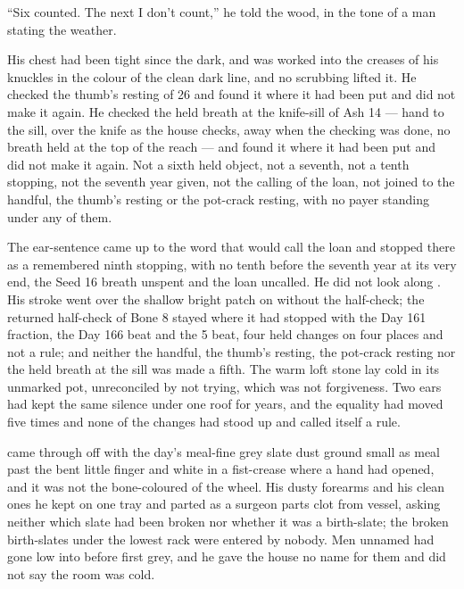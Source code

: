 “Six counted. The next I don't count,” he told the wood, in the tone of a man stating the weather.

His chest had been tight since the dark, and  was worked into the creases of his knuckles in the colour of the clean dark line, and no scrubbing lifted it. He checked the thumb's resting of  26 and found it where it had been put and did not make it again. He checked the held breath at the knife-sill of Ash 14 --- hand to the sill, over the knife as the house checks, away when the checking was done, no breath held at the top of the reach --- and found it where it had been put and did not make it again. Not a sixth held object, not a seventh, not a tenth stopping, not the seventh year given, not the calling of the loan, not joined to the handful, the thumb's resting or the pot-crack resting, with no payer standing under any of them.

The ear-sentence came up to the word that would call the loan and stopped there as a remembered ninth stopping, with no tenth before the seventh year at its very end, the Seed 16 breath unspent and the loan uncalled. He did not look along . His stroke went over the shallow bright patch on  without the half-check; the returned half-check of Bone 8 stayed where it had stopped with the Day 161 fraction, the Day 166 beat and the  5 beat, four held changes on four places and not a rule; and neither the handful, the thumb's resting, the pot-crack resting nor the held breath at the sill was made a fifth. The warm loft stone lay cold in its unmarked pot, unreconciled by not trying, which was not forgiveness. Two ears had kept the same silence under one roof for years, and the equality had moved five times and none of the changes had stood up and called itself a rule.

\scenebreak

 came through  off  with the day's meal-fine grey slate dust ground small as meal past the bent little finger and white in a fist-crease where a hand had opened, and it was not the bone-coloured  of the wheel. His dusty forearms and his clean ones he kept on one tray and parted as a surgeon parts clot from vessel, asking neither which slate had been broken nor whether it was a birth-slate; the broken birth-slates under the lowest rack were entered by nobody. Men unnamed had gone low into  before first grey, and he gave the house no name for them and did not say the room was cold.

